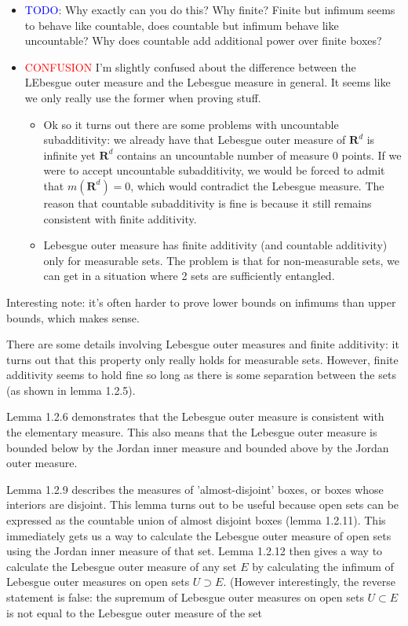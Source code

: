 \documentclass[answers,12pt]{exam}
\begin{document}
\begin{itemize}
    \item \textcolor{blue}{TODO}: Why exactly can you do this? 
    Why finite? 
    Finite but infimum seems to behave like countable, does countable but infimum behave like uncountable?
    Why does countable add additional power over finite boxes?
    \item \textcolor{red}{CONFUSION} I'm slightly confused about the difference between the LEbesgue outer measure and the Lebesgue measure in general. 
    It seems like we only really use the former when proving stuff.
    \begin{itemize}
        \item Ok so it turns out there are some problems with uncountable subadditivity:
        we already have that Lebesgue outer measure of $\mathbf{R}^d$ is infinite yet $\mathbf{R}^d$ contains an uncountable number of measure 0 points.
        If we were to accept uncountable subadditivity, we would be forced to admit that $m(\mathbf{R}^d)=0$, which would contradict the Lebesgue measure. 
        The reason that countable subadditivity is fine is because it still remains consistent with finite additivity.
        \item Lebesgue outer measure has finite additivity (and countable additivity) only for measurable sets.
        The problem is that for non-measurable sets, we can get in a situation where 2 sets are sufficiently entangled.
        
    \end{itemize}
\end{itemize}

Interesting note: it's often harder to prove lower bounds on infimums than upper bounds, which makes sense.

There are some details involving Lebesgue outer measures and finite additivity:
it turns out that this property only really holds for measurable sets.
However, finite additivity seems to hold fine so long as there is some separation between the sets (as shown in lemma 1.2.5).

Lemma 1.2.6 demonstrates that the Lebesgue outer measure is consistent with the elementary measure.
This also means that the Lebesgue outer measure is bounded below by the Jordan inner measure and bounded above by the Jordan outer measure.

Lemma 1.2.9 describes the measures of 'almost-disjoint' boxes, or boxes whose interiors are disjoint.
This lemma turns out to be useful because open sets can be expressed as the countable union of almost disjoint boxes (lemma 1.2.11).
This immediately gets us a way to calculate the Lebesgue outer measure of open sets using the Jordan inner measure of that set.
Lemma 1.2.12 then gives a way to calculate the Lebesgue outer measure of any set $E$ by calculating the infimum of Lebesgue outer measures on open sets $U \supset E$.
(However interestingly, the reverse statement is false: the supremum of Lebesgue outer measures on open sets $U \subset E$ is not equal to the Lebesgue outer measure of the set
\end{document}
